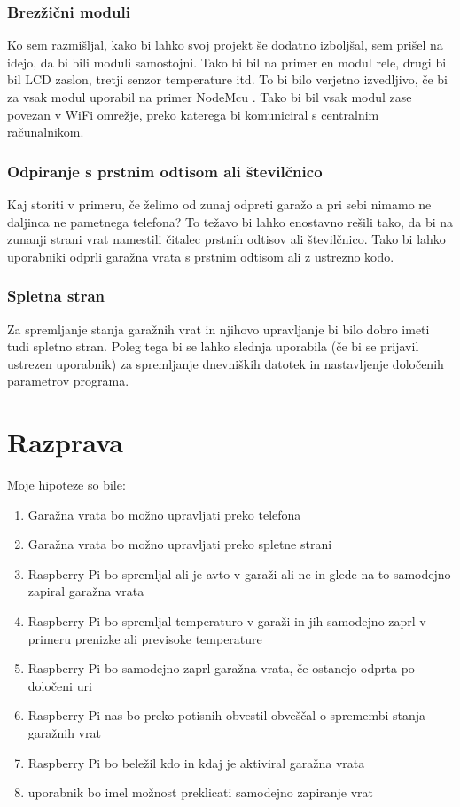 \documentclass[11pt]{article}
\begin{document}
\subsubsection{Brezžični moduli}
Ko sem razmišljal, kako bi lahko svoj projekt še dodatno izboljšal, sem prišel na idejo, da bi bili moduli samostojni. Tako bi bil na primer en modul rele, drugi bi bil LCD zaslon, tretji senzor temperature itd.
To bi bilo verjetno izvedljivo, če bi za vsak modul uporabil na primer NodeMcu \cite{NodeMcu}. Tako bi bil vsak modul zase povezan v WiFi omrežje, preko katerega bi komuniciral s centralnim računalnikom.

\subsubsection{Odpiranje s prstnim odtisom ali številčnico}
Kaj storiti v primeru, če želimo od zunaj odpreti garažo a pri sebi nimamo ne daljinca ne pametnega telefona? To težavo bi lahko enostavno rešili tako, da bi na zunanji strani vrat namestili čitalec prstnih odtisov ali številčnico. Tako bi lahko uporabniki odprli garažna vrata s prstnim odtisom ali z ustrezno kodo.

\subsubsection{Spletna stran}
Za spremljanje stanja garažnih vrat in njihovo upravljanje bi bilo dobro imeti tudi spletno stran. Poleg tega bi se lahko slednja uporabila (če bi se prijavil ustrezen uporabnik) za spremljanje dnevniških datotek in nastavljenje določenih parametrov programa.
\newpage

\section{Razprava}
Moje hipoteze so bile:
\begin{enumerate}
  \setlength\itemsep{0.5mm}
    \item Garažna vrata bo možno upravljati preko telefona
    \item Garažna vrata bo možno upravljati preko spletne strani
    \item Raspberry Pi bo spremljal ali je avto v garaži ali ne in glede na to samodejno zapiral garažna vrata
    \item Raspberry Pi bo spremljal temperaturo v garaži in jih samodejno zaprl v primeru prenizke ali previsoke temperature
    \item Raspberry Pi bo samodejno zaprl garažna vrata, če ostanejo odprta po določeni uri
    \item Raspberry Pi nas bo preko potisnih obvestil obveščal o spremembi stanja garažnih vrat
    \item Raspberry Pi bo beležil kdo in kdaj je aktiviral garažna vrata
    \item uporabnik bo imel možnost preklicati samodejno zapiranje vrat
\end{enumerate}
\end{document}

